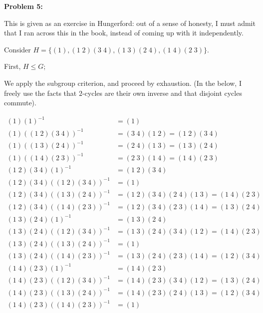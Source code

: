 \documentclass[a4paper,12pt]{article}
\newcommand{\tab}{\hspace{4mm}} %
\newcommand{\shunt}{\vspace{20mm}}
\begin{document}
\shunt

{\bf Problem 5:}

This is given as an exercise in Hungerford: out of a sense of honesty, I must admit that I ran across this in the book, instead of coming up with it independently.

Consider $ H =\{(1), (1 \; 2)(3 \; 4), (1 \; 3) (2 \; 4), (1 \; 4) (2 \; 3)\}$.

First, $H \leq G$;

\tab We apply the subgroup criterion, and proceed by exhaustion. (In the below, I freely use the facts that $2$-cycles are their own inverse and that disjoint cycles commute).

\begin{align*}
(1) (1)^{-1} &= (1)\\
(1) ((1 \; 2)(3 \; 4))^{-1} &= (3 \; 4)(1 \; 2) = (1 \; 2)(3 \; 4)\\
(1) ((1 \; 3) (2 \; 4))^{-1} &= (2 \; 4) (1 \; 3)  =  (1 \; 3) (2 \; 4)\\
(1) ((1 \; 4) (2 \; 3))^{-1} &=  (2 \; 3) (1 \; 4)= (1 \; 4) (2 \; 3)\\
(1 \; 2)(3 \; 4) (1)^{-1} &= (1 \; 2)(3 \; 4)\\
(1 \; 2)(3 \; 4) ((1 \; 2)(3 \; 4))^{-1} &= (1)\\
(1 \; 2)(3 \; 4) ((1 \; 3) (2 \; 4))^{-1} &= (1 \; 2)(3 \; 4) (2 \; 4) (1 \; 3) = (1 \; 4) (2 \; 3)\\
(1 \; 2)(3 \; 4) ((1 \; 4) (2 \; 3))^{-1} &= (1 \; 2)(3 \; 4) (2 \; 3) (1 \; 4) = (1 \; 3) (2 \; 4)\\
(1 \; 3) (2 \; 4) (1)^{-1} &= (1 \; 3) (2 \; 4)\\
(1 \; 3) (2 \; 4) ((1 \; 2)(3 \; 4))^{-1} &= (1 \; 3) (2 \; 4) (3 \; 4) (1 \; 2) =(1 \; 4) (2 \; 3)\\
(1 \; 3) (2 \; 4) ((1 \; 3) (2 \; 4))^{-1} &= (1)\\
(1 \; 3) (2 \; 4) ((1 \; 4) (2 \; 3))^{-1} &= (1 \; 3) (2 \; 4) (2 \; 3) (1 \; 4) = (1 \; 2) (3 \; 4)\\
(1 \; 4) (2 \; 3) (1)^{-1} &= (1 \; 4) (2 \; 3)\\
(1 \; 4) (2 \; 3) ((1 \; 2)(3 \; 4))^{-1} &= (1 \; 4) (2 \; 3) (3 \; 4) (1 \; 2) = (1 \; 3) (2 \; 4)\\
(1 \; 4) (2 \; 3) ((1 \; 3) (2 \; 4))^{-1} &= (1 \; 4) (2 \; 3) (2 \; 4) (1 \; 3) = (1 \; 2) (3 \; 4)\\
(1 \; 4) (2 \; 3) ((1 \; 4) (2 \; 3))^{-1} &= (1)
\end{align*}
\end{document}
